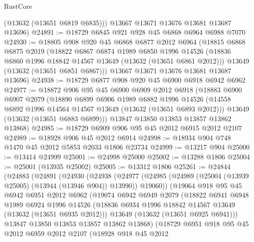 \begin{lexlean}{RustCore}
\begin{coremodule}
        (@13632 (@13651 @6819 @6835)))
      @13667
      @13671
      @13676
      @13681
      @13687
      @13696)
@24891 := @18729 @6845 @921 @928 @45 @6868 @6964 @6988 @7070
@24930 := @18805
    @908
    @920
    @45
    @6868
    @6877
    @2012
    @6964
    (@18815
      @6868
      @6875
      @2019
      (@18822
        @6867
        @6874
        @1989
        @6850
        @1996
        @14526
        (@18836 @6860 @1996 @18842 @14567 @13649 (@13632 (@13651 @6861 @2012)))
        @13649
        (@13632 (@13651 @6851 @6867)))
      @13667
      @13671
      @13676
      @13681
      @13687
      @13696)
@24938 := @18729 @6877 @908 @920 @45 @6900 @6918 @6942 @6962
@24977 := @18872
    @906
    @95
    @45
    @6900
    @6909
    @2012
    @6918
    (@18883
      @6900
      @6907
      @2079
      (@18890
        @6899
        @6906
        @1989
        @6882
        @1996
        @14526
        (@14558 @6892 @1996 @14564 @14567 @13649 (@13632 (@13651 @6893 @2012)))
        @13649
        (@13632 (@13651 @6883 @6899)))
      @13847
      @13850
      @13853
      @13857
      @13862
      @13868)
@24985 := @18729 @6909 @906 @95 @45 @2012 @6915 @2012 @2107
@24989 := @18928 @906 @45 @2012 @6914
@24998 := @18934 @904 @748 @1470 @45 @2012 @5853 @2033 @1806 @23734
@24999 := @13217 @904
@25000 := @13414 @24999
@25001 := @24998 @25000
@25002 := @13288 @1806
@25004 := @25001 (@13935 @25002)
@25005 := @13312 @1806
@25261 := @24844
    (@24883
      (@24891
        (@24930
          (@24938
            (@24977 (@24985 (@24989 (@25004 (@13939 @25005) (@13944 (@13946 @904)) @13990)) @19060))
            (@19064
              @918
              @95
              @45
              @6942
              @6951
              @2012
              @6962
              (@19074
                @6942
                @6949
                @2079
                (@18822
                  @6941
                  @6948
                  @1989
                  @6924
                  @1996
                  @14526
                  (@18836 @6934 @1996 @18842 @14567 @13649 (@13632 (@13651 @6935 @2012)))
                  @13649
                  (@13632 (@13651 @6925 @6941)))
                @13847
                @13850
                @13853
                @13857
                @13862
                @13868)
              (@18729
                @6951
                @918
                @95
                @45
                @2012
                @6959
                @2012
                @2107
                (@18928
                  @918
                  @45
                  @2012

\end{coremodule}
\end{lexlean}
